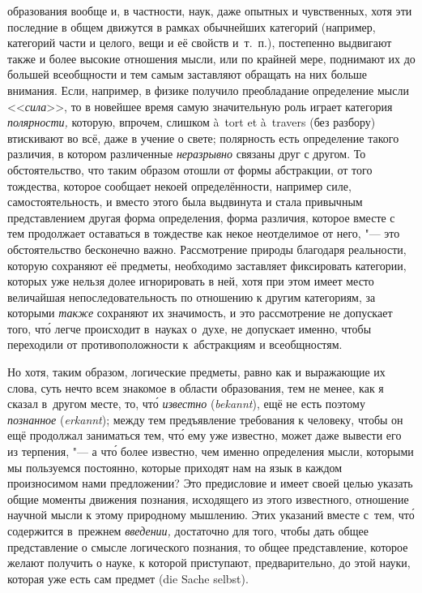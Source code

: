образования вообще и, в частности, наук, даже опытных и чувственных, хотя эти
последние в общем движутся в рамках обычнейших категорий (например, категорий
части и целого, вещи и её свойств и~т.~п.), постепенно выдвигают также и более
высокие отношения мысли, или по крайней мере, поднимают их до большей
всеобщности и тем самым заставляют обращать на них больше внимания. Если,
например, в физике получило преобладание определение мысли <<{\em сила}>>, то в
новейшее время самую значительную роль играет категория {\em полярности,}
которую, впрочем, слишком à~tort et à~travers (без разбору) втискивают во всё,
даже в учение о свете; полярность есть определение такого различия, в
котором различенные {\em неразрывно} связаны друг с другом. То обстоятельство,
что таким образом отошли от формы абстракции, от того тождества, которое
сообщает некоей определённости, например силе, самостоятельность, и вместо
этого была выдвинута и стала привычным представлением другая форма определения,
форма различия, которое вместе с тем продолжает оставаться в тождестве как
некое неотделимое от него, "--- это обстоятельство бесконечно важно.
Рассмотрение природы благодаря реальности, которую сохраняют её предметы,
необходимо заставляет фиксировать категории, которых уже нельзя долее
игнорировать в ней, хотя при этом имеет место величайшая непоследовательность
по отношению к другим категориям, за которыми {\em также} сохраняют их
значимость, и это рассмотрение не допускает того, чт\'{о} легче происходит
в~науках о~духе, не допускает именно, чтобы переходили от противоположности
к~абстракциям и всеобщностям.

Но хотя, таким образом, логические предметы, равно как и выражающие их слова,
суть нечто всем знакомое в области образования, тем не менее, как я сказал
в~другом месте, то,
чт\'{о} {\em известно} ({\em bekannt}), ещё не есть поэтому {\em познанное}
({\em erkannt}); между тем предъявление требования к человеку, чтобы он ещё
продолжал заниматься тем, чт\'{о} ему уже известно, может даже вывести его из
терпения, "--- а чт\'{о} более известно, чем именно определения мысли, которыми
мы пользуемся постоянно, которые приходят нам на язык в каждом произносимом
нами предложении? Это предисловие и имеет своей целью указать общие моменты
движения познания, исходящего из этого известного, отношение научной мысли к
этому природному мышлению. Этих указаний вместе с~тем, чт\'{о} содержится
в~прежнем {\em введении,} достаточно для того, чтобы дать общее представление о
смысле логического познания, то общее представление, которое желают получить о
науке, к которой приступают, предварительно, до этой науки, которая уже есть
сам предмет (die Sache selbst).

